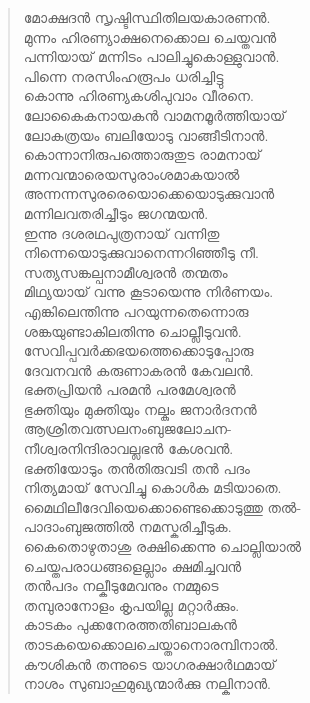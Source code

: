 \begin{verse}
മോക്ഷദന്‍ സൃഷ്ടിസ്ഥിതിലയകാരണന്‍.\\
മുന്നം ഹിരണ്യാക്ഷനെക്കൊല ചെയ്തവന്‍\\
പന്നിയായ് മന്നിടം പാലിച്ചുകൊള്ളുവാന്‍.\\
പിന്നെ നരസിംഹരൂപം ധരിച്ചിട്ടു\\
കൊന്നു ഹിരണ്യകശിപുവാം വീരനെ.\\
ലോകൈകനായകന്‍ വാമനമൂര്‍ത്തിയായ്\\
ലോകത്രയം ബലിയോടു വാങ്ങീടിനാന്‍.\\
കൊന്നാനിരുപത്തൊരുതുട രാമനായ്\\
മന്നവന്മാരെയസുരാംശമാകയാല്‍\\
അന്നന്നസുരരെയൊക്കെയൊടുക്കുവാന്‍\\
മന്നിലവതരിച്ചീടും ജഗന്മയന്‍.\\
ഇന്നു ദശരഥപുത്രനായ് വന്നിതു\\
നിന്നെയൊടുക്കുവാനെന്നറിഞ്ഞീടു നീ.\\
സത്യസങ്കല്പനാമീശ്വരന്‍ തന്മതം\\
മിഥ്യയായ് വന്നു കൂടായെന്നു നിര്‍ണയം.\\
എങ്കിലെന്തിന്നു പറയുന്നതെന്നൊരു\\
ശങ്കയുണ്ടാകിലതിന്നു ചൊല്ലീടുവന്‍.\\
സേവിപ്പവര്‍ക്കഭയത്തെക്കൊടുപ്പോരു\\
ദേവനവന്‍ കരുണാകരന്‍ കേവലന്‍.\\
ഭക്തപ്രിയന്‍ പരമന്‍ പരമേശ്വരന്‍\\
ഭുക്തിയും മുക്തിയും നല്കും ജനാര്‍ദനന്‍\\
ആശ്രിതവത്സലനംബുജലോചന-\\
നീശ്വരനിന്ദിരാവല്ലഭന്‍ കേശവന്‍.\\
ഭക്തിയോടും തന്‍തിരുവടി തന്‍ പദം\\
നിത്യമായ് സേവിച്ചു കൊള്‍ക മടിയാതെ.\\
മൈഥിലീദേവിയെക്കൊണ്ടെക്കൊടുത്തു തല്‍-\\
പാദാംബുജത്തില്‍ നമസ്കരിച്ചീടുക.\\
കൈതൊഴുതാശു രക്ഷിക്കെന്നു ചൊല്ലിയാല്‍\\
ചെയ്തപരാധങ്ങളെല്ലാം ക്ഷമിച്ചവന്‍\\
തന്‍പദം നല്കീടുമേവനും നമ്മുടെ\\
തമ്പുരാനോളം കൃപയില്ല മറ്റാര്‍ക്കും.\\
കാടകം പുക്കനേരത്തതിബാലകന്‍\\
താടകയെക്കൊലചെയ്താനൊരമ്പിനാല്‍.\\
കൗശികന്‍ തന്നുടെ യാഗരക്ഷാര്‍ഥമായ്\\
നാശം സുബാഹുമുഖ്യന്മാര്‍ക്കു നല്കിനാന്‍.\\

\end{verse}

